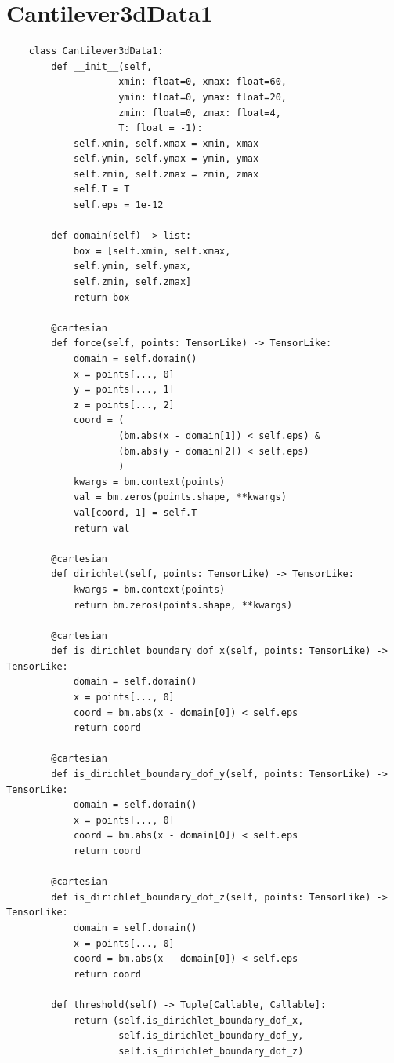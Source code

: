 \documentclass[mathpazo]{cicp}
\begin{document}
\section{Cantilever3dData1}
\label{sec:code_canti_3d}
\begin{lstlisting}
	class Cantilever3dData1:
		def __init__(self,
					xmin: float=0, xmax: float=60, 
					ymin: float=0, ymax: float=20,
					zmin: float=0, zmax: float=4,
					T: float = -1):
			self.xmin, self.xmax = xmin, xmax
			self.ymin, self.ymax = ymin, ymax
			self.zmin, self.zmax = zmin, zmax
			self.T = T 
			self.eps = 1e-12
		
		def domain(self) -> list:
			box = [self.xmin, self.xmax, 
			self.ymin, self.ymax, 
			self.zmin, self.zmax]
			return box
		
		@cartesian
		def force(self, points: TensorLike) -> TensorLike:
			domain = self.domain()
			x = points[..., 0]
			y = points[..., 1]
			z = points[..., 2]
			coord = (
					(bm.abs(x - domain[1]) < self.eps) & 
					(bm.abs(y - domain[2]) < self.eps)
					)
			kwargs = bm.context(points)
			val = bm.zeros(points.shape, **kwargs)
			val[coord, 1] = self.T
			return val
		
		@cartesian
		def dirichlet(self, points: TensorLike) -> TensorLike:
			kwargs = bm.context(points)
			return bm.zeros(points.shape, **kwargs)
		
		@cartesian
		def is_dirichlet_boundary_dof_x(self, points: TensorLike) -> TensorLike:
			domain = self.domain()
			x = points[..., 0]
			coord = bm.abs(x - domain[0]) < self.eps
			return coord
		
		@cartesian
		def is_dirichlet_boundary_dof_y(self, points: TensorLike) -> TensorLike:
			domain = self.domain()
			x = points[..., 0]
			coord = bm.abs(x - domain[0]) < self.eps
			return coord
		
		@cartesian
		def is_dirichlet_boundary_dof_z(self, points: TensorLike) -> TensorLike:
			domain = self.domain()
			x = points[..., 0]
			coord = bm.abs(x - domain[0]) < self.eps
			return coord
		
		def threshold(self) -> Tuple[Callable, Callable]:
			return (self.is_dirichlet_boundary_dof_x, 
					self.is_dirichlet_boundary_dof_y,
					self.is_dirichlet_boundary_dof_z)
\end{lstlisting}
\end{document}
